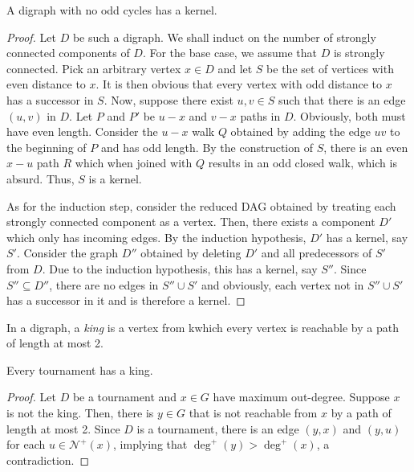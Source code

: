 \begin{theorem}[Richardson, 1953]
    A digraph with no odd cycles has a kernel.
\end{theorem}
\begin{proof}
    Let $D$ be such a digraph. We shall induct on the number of strongly connected components of $D$. For the base case, we assume that $D$ is strongly connected. Pick an arbitrary vertex $x\in D$ and let $S$ be the set of vertices with even distance to $x$. It is then obvious that every vertex with odd distance to $x$ has a successor in $S$. Now, suppose there exist $u,v\in S$ such that there is an edge $(u,v)$ in $D$. Let $P$ and $P'$ be $u-x$ and $v-x$ paths in $D$. Obviously, both must have even length. Consider the $u-x$ walk $Q$ obtained by adding the edge $uv$ to the beginning of $P$ and has odd length. By the construction of $S$, there is an even $x-u$ path $R$ which when joined with $Q$ results in an odd closed walk, which is absurd. Thus, $S$ is a kernel.

    As for the induction step, consider the reduced DAG obtained by treating each strongly connected component as a vertex. Then, there exists a component $D'$ which only has incoming edges. By the induction hypothesis, $D'$ has a kernel, say $S'$. Consider the graph $D''$ obtained by deleting $D'$ and all predecessors of $S'$ from $D$. Due to the induction hypothesis, this has a kernel, say $S''$. Since $S''\subseteq D''$, there are no edges in $S''\cup S'$ and obviously, each vertex not in $S''\cup S'$ has a successor in it and is therefore a kernel.
\end{proof}

\begin{definition}[King]
    In a digraph, a \textit{king} is a vertex from kwhich every vertex is reachable by a path of length at most 2.
\end{definition}

\begin{theorem}[Landau, 1953]
    Every tournament has a king.
\end{theorem}
\begin{proof}
    Let $D$ be a tournament and $x\in G$ have maximum out-degree. Suppose $x$ is not the king. Then, there is $y\in G$ that is not reachable from $x$ by a path of length at most 2. Since $D$ is a tournament, there is an edge $(y, x)$ and $(y,u)$ for each $u\in\mathcal{N}^+(x)$, implying that $\deg^+(y) > \deg^+(x)$, a contradiction.
\end{proof}

